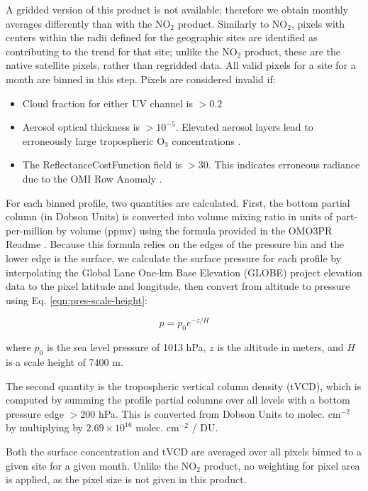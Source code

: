 \documentclass[a4paper,10pt,oneside]{article}
\newcommand{\ce}[1]{$\mathrm{#1}$}
\begin{document}
\begin{sloppy}
	A gridded version of this product is not available; therefore we obtain monthly averages differently than with the \ce{NO_2} product. Similarly to \ce{NO_2}, pixels with centers within the radii defined for the geographic sites are identified as contributing to the trend for that site; unlike the \ce{NO_2} product, these are the native satellite pixels, rather than regridded data. All valid pixels for a site for a month are binned in this step. Pixels are considered invalid if:
	
	\begin{itemize}
	\item Cloud fraction for either UV channel is $> 0.2$
	\item Aerosol optical thickness is $> 10^{-5}$. Elevated aerosol layers lead to erroneously large tropospheric \ce{O_3} concentrations \cite{omo3pr-readme}.
	\item The ReflectanceCostFunction field is $> 30$. This indicates erroneous radiance due to the OMI Row Anomaly \cite{row-anomaly}.
	\end{itemize}
	
	For each binned profile, two quantities are calculated. First, the bottom partial column (in Dobson Units) is converted into volume mixing ratio in units of part-per-million by volume (ppmv) using the formula provided in the OMO3PR Readme \cite{omo3pr-readme}. Because this formula relies on the edges of the pressure bin and the lower edge is the surface, we calculate the surface pressure for each profile by interpolating the Global Lane One-km Base Elevation (GLOBE) project elevation data \cite{globe} to the pixel latitude and longitude, then convert from altitude to pressure using Eq. \eqref{eqn:pres-scale-height}:
	
	\begin{equation}
	\label{eqn:pres-scale-height}
	p = p_0 e^{-z/H}
	\end{equation}
	
	where $p_0$ is the sea level pressure of 1013 hPa, $z$ is the altitude in meters, and $H$ is a scale height of 7400 m.
	
	The second quantity is the tropospheric vertical column density (tVCD), which is computed by summing the profile partial columns over all levels with a bottom pressure edge $> 200$ hPa. This is converted from Dobson Units to molec. cm$^{-2}$ by multiplying by $2.69 \times 10^{16}$
molec. cm$^{-2}$ / DU. 

	Both the surface concentration and tVCD are averaged over all pixels binned to a given site for a given month. Unlike the \ce{NO_2} product, no weighting for pixel area is applied, as the pixel size is not given in this product.
	 

\end{sloppy}
\end{document}
